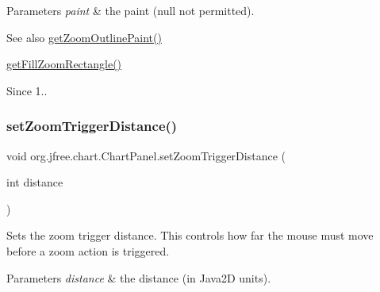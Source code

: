 \begin{DoxyParams}{Parameters}
{\em paint} & the paint ({\ttfamily null} not permitted).\\
\hline
\end{DoxyParams}
\begin{DoxySeeAlso}{See also}
\mbox{\hyperlink{classorg_1_1jfree_1_1chart_1_1_chart_panel_a2db2a730b563e5e3145d11985beb23df}{get\+Zoom\+Outline\+Paint()}} 

\mbox{\hyperlink{classorg_1_1jfree_1_1chart_1_1_chart_panel_a718c81edc5ae54b6fb8221d6ac05947d}{get\+Fill\+Zoom\+Rectangle()}}
\end{DoxySeeAlso}
\begin{DoxySince}{Since}
1.. 
\end{DoxySince}
\mbox{\label{classorg_1_1jfree_1_1chart_1_1_chart_panel_aad79bcbc2f2461e923a959dee8bfadcc}} 
\subsubsection{\texorpdfstring{set\+Zoom\+Trigger\+Distance()}{setZoomTriggerDistance()}}
{\footnotesize\ttfamily void org.\+jfree.\+chart.\+Chart\+Panel.\+set\+Zoom\+Trigger\+Distance (\begin{DoxyParamCaption}\item[{int}]{distance }\end{DoxyParamCaption})}

Sets the zoom trigger distance. This controls how far the mouse must move before a zoom action is triggered.


\begin{DoxyParams}{Parameters}
{\em distance} & the distance (in Java2D units). \\
\hline
\end{DoxyParams}
\mbox{\label{classorg_1_1jfree_1_1chart_1_1_chart_panel_ad8101f9b70e800c7f93fadc36fc95993}} 
